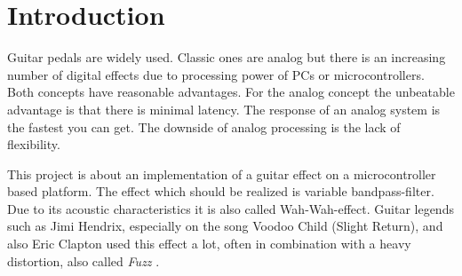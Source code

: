 \section{Introduction}

Guitar pedals are widely used. Classic ones are analog but there is an increasing number of
digital effects due to processing power of PCs or microcontrollers. Both concepts have
reasonable advantages. For the analog concept the unbeatable advantage is that there is
minimal latency. The response of an analog system is the fastest you can get. The downside of analog
processing is the lack of flexibility. %

This project is about an implementation of a guitar effect on a microcontroller based platform.
The effect which should be realized is variable bandpass-filter.
Due to its acoustic characteristics it is also called \frqq Wah-Wah\flqq-effect.
Guitar legends such as Jimi Hendrix, especially on the song Voodoo Child (Slight Return),
and also Eric Clapton used this effect a lot, often in combination with a heavy distortion, also called \textit{Fuzz}
\cite{dailey_e_guitar} \cite{wiki_wahwah}.
